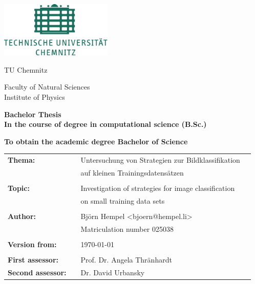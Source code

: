 \thispagestyle{empty}

\includegraphics[width=0.4\textwidth]{images/tu_chemnitz}\\[2\baselineskip]

\begin{center}
\Large{TU Chemnitz}
\end{center}


\begin{center}
\Large{Faculty of Natural Sciences}\\
\Large{Institute of Physics}\\[4\baselineskip]
\end{center}

\begin{center}
\textbf{\LARGE{Bachelor Thesis}}\\[2\baselineskip]
\textbf{{In the course of degree in computational science (B.Sc.)}}
\end{center}

\begin{center}
\textbf{{To obtain the academic degree Bachelor of Science}}
\end{center}

\vspace*{\fill}
\begin{flushleft}
\begin{tabular}{llll}
\textbf{Thema:} & & Untersuchung von Strategien zur Bildklassifikation \\
& & auf kleinen Trainingsdatensätzen & \\
& & \\
\textbf{Topic:} & & Investigation of strategies for image classification \\
& & on small training data sets & \\
& & \\
\textbf{Author:} & & Björn Hempel \textless{bjoern@hempel.li}\textgreater & \\
& & Matriculation number 025038 & \\
& & \\
\textbf{Version from:} & & \today &\\
& & \\
\textbf{First assessor:} & & Prof. Dr. Angela Thränhardt &\\
\textbf{Second assessor:} & & Dr. David Urbansky &\\
\end{tabular}
\end{flushleft}



